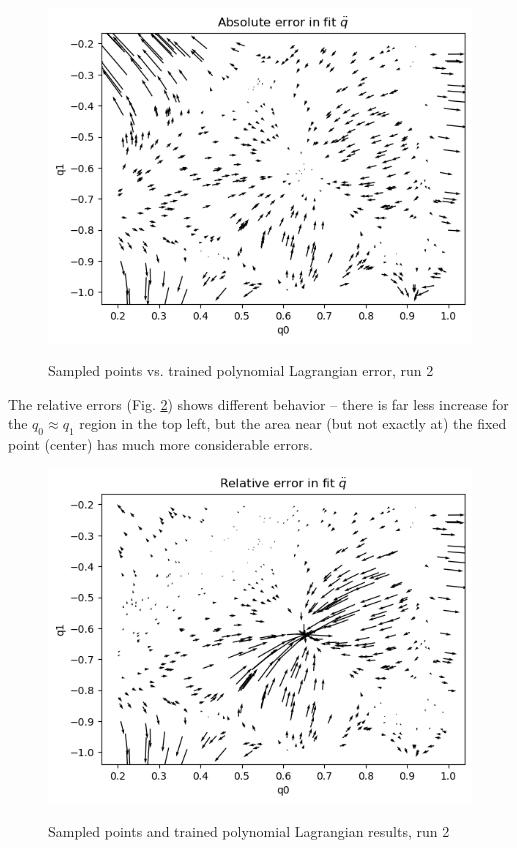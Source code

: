 \documentclass[]{article}
\begin{document}
\begin{figure}[H]
	\caption{Sampled points vs. trained polynomial Lagrangian error, run 2}
	\centering
	\includegraphics[scale=0.60]{poly-fit-errors-2.png}
	\label{fig:poly-fit-errors-2}
\end{figure}

The relative errors (Fig. \ref{fig:poly-fit-errors-relative-2}) shows different behavior -- there is far less increase for the $q_0\approx q_1$ region in the top left, but the area near (but not exactly at) the fixed point (center) has much more considerable errors. 

\begin{figure}[H]
	\caption{Sampled points and trained polynomial Lagrangian results, run 2}
	\centering
	\includegraphics[scale=0.60]{poly-fit-errors-relative-2.png}
	\label{fig:poly-fit-errors-relative-2}
\end{figure}
\end{document}
